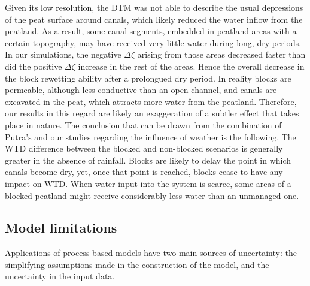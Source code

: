 \documentclass[bg, manuscript]{copernicus}
\begin{document}
Given its low resolution, the DTM was not able to describe the usual depressions of the peat surface around canals, which likely reduced the water inflow from the peatland.
As a result, some canal segments, embedded in peatland areas with a certain topography, may have received very little water during long, dry periods.
In our simulations, the negative $\Delta \zeta$ arising from those areas decreased faster than did the positive $\Delta \zeta$ increase in the rest of the areas.
Hence the overall decrease in the block rewetting ability after a prolongued dry period.
In reality blocks are permeable, although less conductive than an open channel, and canals are excavated in the peat, which attracts more water from the peatland.
Therefore, our results in this regard are likely an exaggeration of a subtler effect that takes place in nature.
The conclusion that can be drawn from the combination of Putra's and our studies regarding the influence of weather is the following.
The WTD difference between the blocked and non-blocked scenarios is generally greater in the absence of rainfall.
Blocks are likely to delay the point in which canals become dry, yet, once that point is reached, blocks cease to have any impact on WTD.
When water input into the system is scarce, some areas of a blocked peatland might receive considerably less water than an unmanaged one.


\subsection{Model limitations}

Applications of process-based models have two main sources of uncertainty: the simplifying assumptions made in the construction of the model, and the uncertainty in the input data.
\end{document}
